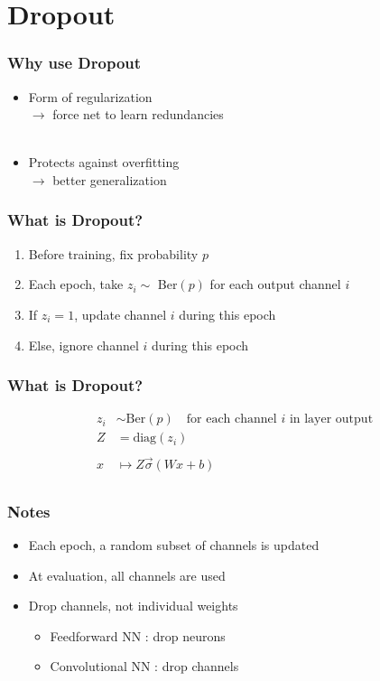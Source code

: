 \documentclass[aspectratio=169,14pt]{beamer}
\begin{document}
\section{Dropout}
\begin{frame}
    \frametitle{Why use Dropout}
\begin{itemize}
    \item Form of regularization \\ \qquad\qquad $\rightarrow$ force net to learn redundancies ~\\~\\
    \item Protects against overfitting \\\qquad\qquad $\rightarrow$ better generalization
\end{itemize}
\end{frame}


\begin{frame}
    \frametitle{What is Dropout?}
\begin{enumerate}
    \item Before training, fix probability $p$
    \item Each epoch, take $z_i \sim$ Ber$(p)$ for each output channel $i$
    \item If $z_i = 1$, update channel $i$ during this epoch
    \item Else, ignore channel $i$ during this epoch
\end{enumerate}
\end{frame}

\begin{frame}
    \frametitle{What is Dropout?}
\begin{equation*} \begin{split}
z_i &\sim \text{Ber}(p) \quad \text{for each channel }i \text{ in layer output} \\
Z &= \text{diag}(z_i) \\
&\\
x &\mapsto Z \vec{\sigma}(W x + b) \\
\end{split} \end{equation*}
\end{frame}

\begin{frame}
    \frametitle{Notes}
\begin{itemize}
    \item Each epoch, a random subset of channels is updated
    \item At evaluation, all channels are used
    \item Drop channels, not individual weights
    \begin{itemize}
        \item Feedforward NN : drop neurons
        \item Convolutional NN : drop channels
    \end{itemize}
\end{itemize}
\end{frame}
\end{document}
